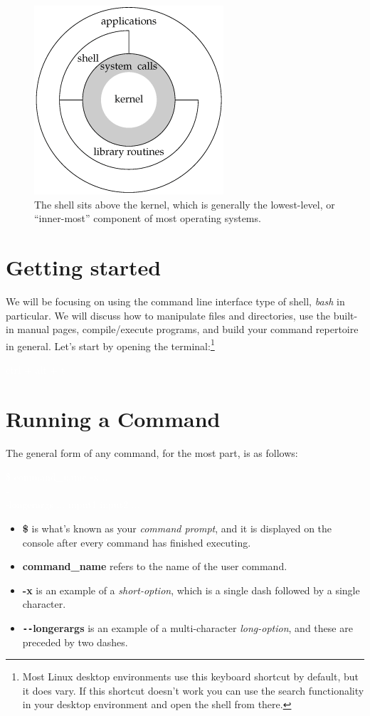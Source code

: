 \documentclass[oneside]{book}
\newcommand{\commandline}[1]{\begin{center} \colorbox{Dark}{\textcolor{white}{#1}} \end{center}}
\begin{document}
\begin{figure}[H]
	\centering
	\includegraphics[scale=0.5]{kernel.png}
	\caption{The shell sits above the kernel, which is generally the lowest-level, or ``inner-most'' component of most operating systems.} 
\end{figure}

\section{Getting started}
We will be focusing on using the command line interface type of shell, \textit{bash} in particular. We will discuss how to manipulate files and directories, use the built-in manual pages, compile/execute programs, and build your command repertoire in general. Let's start by opening the terminal:\footnote{Most Linux desktop environments use this keyboard shortcut by default, but it does vary. If this shortcut doesn't work you can use the search functionality in your desktop environment and open the shell from there.}

\commandline{ctrl + alt + t}



\section{Running a Command}
The general form of any command, for the most part, is as follows:
\commandline{\$ command\_name -x ... \ \\-\\-longerargs ... input1 input2 ...}
\begin{itemize}
    \item \textbf{\$} is what's known as your \textit{command prompt}, and it is displayed on the console after every command has finished executing.
    \item \textbf{command\_name} refers to the name of the user command.
    \item \textbf{-x} is an example of a \textit{short-option}, which is a single dash followed by a single character.
    \item \textbf{\texttt{-{}-}longerargs} is an example of a multi-character \textit{long-option}, and these are preceded by two dashes.\\
\end{itemize}
\end{document}
